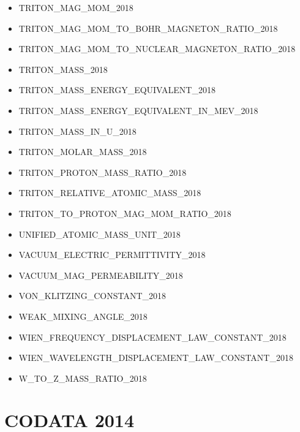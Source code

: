 \begin{itemize}
  TRITON\_G\_FACTOR\_2018
\item
  TRITON\_MAG\_MOM\_2018
\item
  TRITON\_MAG\_MOM\_TO\_BOHR\_MAGNETON\_RATIO\_2018
\item
  TRITON\_MAG\_MOM\_TO\_NUCLEAR\_MAGNETON\_RATIO\_2018
\item
  TRITON\_MASS\_2018
\item
  TRITON\_MASS\_ENERGY\_EQUIVALENT\_2018
\item
  TRITON\_MASS\_ENERGY\_EQUIVALENT\_IN\_MEV\_2018
\item
  TRITON\_MASS\_IN\_U\_2018
\item
  TRITON\_MOLAR\_MASS\_2018
\item
  TRITON\_PROTON\_MASS\_RATIO\_2018
\item
  TRITON\_RELATIVE\_ATOMIC\_MASS\_2018
\item
  TRITON\_TO\_PROTON\_MAG\_MOM\_RATIO\_2018
\item
  UNIFIED\_ATOMIC\_MASS\_UNIT\_2018
\item
  VACUUM\_ELECTRIC\_PERMITTIVITY\_2018
\item
  VACUUM\_MAG\_PERMEABILITY\_2018
\item
  VON\_KLITZING\_CONSTANT\_2018
\item
  WEAK\_MIXING\_ANGLE\_2018
\item
  WIEN\_FREQUENCY\_DISPLACEMENT\_LAW\_CONSTANT\_2018
\item
  WIEN\_WAVELENGTH\_DISPLACEMENT\_LAW\_CONSTANT\_2018
\item
  W\_TO\_Z\_MASS\_RATIO\_2018
\end{itemize}

\section{CODATA 2014}


